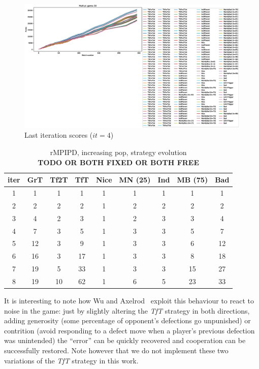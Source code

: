 \documentclass[journal,a4paper,10pt,twoside]{IEEEtran} %
\begin{document}
\begin{figure}[!ht]
    \centering
    \includegraphics[width=1\columnwidth]{../img/ripdmp-incr/ripdmp-scores-increasing-pop-50-r4}
    \caption{Last iteration scores ($it=4$)}
    \label{fig:incrLI}
\end{figure}

\begin{table}[ht]
    \caption{rMPIPD, increasing pop, strategy evolution\\ \textbf{TODO OR BOTH FIXED OR BOTH FREE}}
    \label{tab:ripdmp-const}
    \centering
    \begin{tabular}{c|cccccccc} \toprule
        iter & GrT & Tf2T & TfT & Nice & MN (25) & Ind & MB (75) & Bad \\ \midrule
        1 &   1 &   1 &   1 &  1 &  1 &  1 &   1 &   1 \\
        2 &   2 &   2 &   2 &  1 &  2 &  2 &   2 &   2 \\
        3 &   4 &   2 &   3 &  1 &  2 &  3 &   3 &   4 \\
        4 &   7 &   3 &   5 &  1 &  3 &  3 &   5 &   7 \\
        5 &  12 &   3 &   9 &  1 &  3 &  3 &   6 &  12 \\
        6 &  16 &   3 &  17 &  1 &  3 &  3 &   8 &  18 \\
        7 &  19 &   5 &  33 &  1 &  3 &  3 &  15 &  27 \\
        8 &  19 &  10 &  62 &  1 &  6 &  5 &  23 &  33 \\ \bottomrule
    \end{tabular}
\end{table}

It is interesting to note how Wu and Axelrod~\cite{IPDnoise} exploit this behaviour to react to noise in the game: just by slightly altering the \textit{TfT} strategy in both directions, adding generosity (some percentage of opponent's defections go unpunished) or contrition (avoid responding to a defect move when a player's previous defection was unintended) the ``error'' can be quickly recovered and cooperation can be successfully restored. Note however that we do not implement these two variations of the \textit{TfT} strategy in this work.
\end{document}
